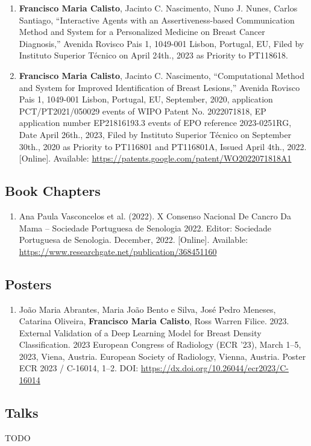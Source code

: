 \begin{enumerate}
\item {\bf Francisco Maria Calisto}, Jacinto C. Nascimento, Nuno J. Nunes, Carlos Santiago, ``Interactive Agents with an Assertiveness-based Communication Method and System for a Personalized Medicine on Breast Cancer Diagnosis,'' Avenida Rovisco Pais 1, 1049-001 Lisbon, Portugal, \acf{EU}, Filed by Instituto Superior T\'{e}cnico on April 24th., 2023 as Priority to PT118618.
\item {\bf Francisco Maria Calisto}, Jacinto C. Nascimento, ``Computational Method and System for Improved Identification of Breast Lesions,'' Avenida Rovisco Pais 1, 1049-001 Lisbon, Portugal, \acf{EU}, September, 2020, application PCT/PT2021/050029 events of \acf{WIPO} Patent No. 2022071818, EP application number EP21816193.3 events of \ac{EPO} reference 2023-0251RG, Date April 26th., 2023, Filed by Instituto Superior T\'{e}cnico on September 30th., 2020 as Priority to PT116801 and PT116801A, Issued April 4th., 2022. [Online]. Available: \href{https://patents.google.com/patent/WO2022071818A1}{https://patents.google.com/patent/WO2022071818A1}
\end{enumerate}

\subsection{Book Chapters}
\label{sec:chap00100604}

\begin{enumerate}
\item Ana Paula Vasconcelos et al. (2022). X Consenso Nacional De Cancro Da Mama -- Sociedade Portuguesa de Senologia 2022. Editor: Sociedade Portuguesa de Senologia. December, 2022. [Online]. Available: \href{https://www.researchgate.net/publication/368451160}{https://www.researchgate.net/publication/368451160}
\end{enumerate}

\subsection{Posters}
\label{sec:chap00100605}

\begin{enumerate}
\item Jo\~{a}o Maria Abrantes, Maria Jo\~{a}o Bento e Silva, Jos\'{e} Pedro Meneses, Catarina Oliveira, {\bf Francisco Maria Calisto}, Ross Warren Filice. 2023. External Validation of a Deep Learning Model for Breast Density Classification. 2023 European Congress of Radiology (ECR '23), March 1--5, 2023, Viena, Austria. European Society of Radiology, Vienna, Austria. Poster ECR 2023 / C-16014, 1–2. DOI: \href{https://dx.doi.org/10.26044/ecr2023/C-16014}{https://dx.doi.org/10.26044/ecr2023/C-16014}
\end{enumerate}

\subsection{Talks}
\label{sec:chap00100606}

TODO